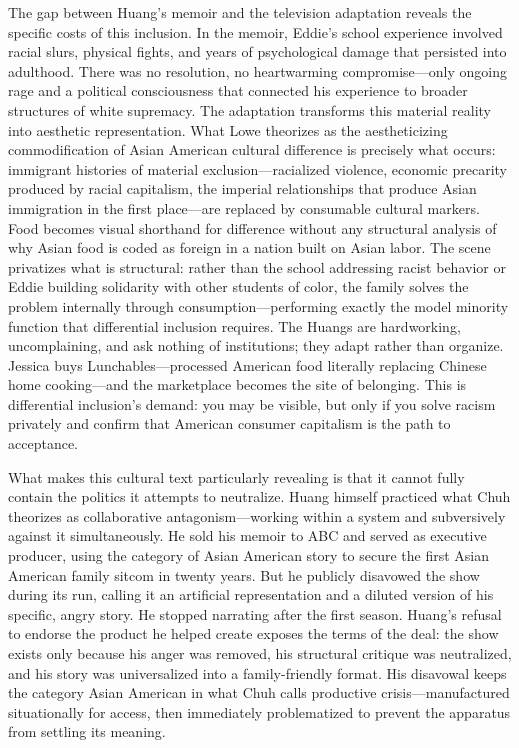 \documentclass[12pt]{article}
\begin{document}
The gap between Huang's memoir and the television adaptation reveals the specific costs of this inclusion. In the memoir, Eddie's school experience involved racial slurs, physical fights, and years of psychological damage that persisted into adulthood. There was no resolution, no heartwarming compromise---only ongoing rage and a political consciousness that connected his experience to broader structures of white supremacy. The adaptation transforms this material reality into aesthetic representation. What Lowe theorizes as the aestheticizing commodification of Asian American cultural difference is precisely what occurs: immigrant histories of material exclusion---racialized violence, economic precarity produced by racial capitalism, the imperial relationships that produce Asian immigration in the first place---are replaced by consumable cultural markers. Food becomes visual shorthand for difference without any structural analysis of why Asian food is coded as foreign in a nation built on Asian labor. The scene privatizes what is structural: rather than the school addressing racist behavior or Eddie building solidarity with other students of color, the family solves the problem internally through consumption---performing exactly the model minority function that differential inclusion requires. The Huangs are hardworking, uncomplaining, and ask nothing of institutions; they adapt rather than organize. Jessica buys Lunchables---processed American food literally replacing Chinese home cooking---and the marketplace becomes the site of belonging. This is differential inclusion's demand: you may be visible, but only if you solve racism privately and confirm that American consumer capitalism is the path to acceptance.

What makes this cultural text particularly revealing is that it cannot fully contain the politics it attempts to neutralize. Huang himself practiced what Chuh theorizes as collaborative antagonism---working within a system and subversively against it simultaneously. He sold his memoir to ABC and served as executive producer, using the category of Asian American story to secure the first Asian American family sitcom in twenty years. But he publicly disavowed the show during its run, calling it an artificial representation and a diluted version of his specific, angry story. He stopped narrating after the first season. Huang's refusal to endorse the product he helped create exposes the terms of the deal: the show exists only because his anger was removed, his structural critique was neutralized, and his story was universalized into a family-friendly format. His disavowal keeps the category Asian American in what Chuh calls productive crisis---manufactured situationally for access, then immediately problematized to prevent the apparatus from settling its meaning.
\end{document}
